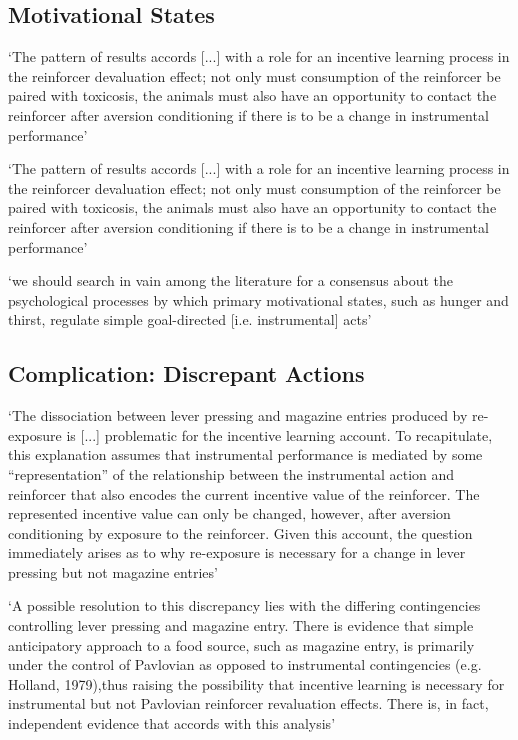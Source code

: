 \documentclass[12pt]{extarticle}
\begin{document}
\begin{multicols*}{3}
 
 
\section{Motivational States}
 
‘The pattern of results accords [...] with a role for an incentive learning
process in the reinforcer devaluation effect;
not only must consumption of
the reinforcer be paired with toxicosis,
the animals must also have an
opportunity to contact the reinforcer after aversion conditioning if there is
to be a change in instrumental performance’
\citep[p.~293]{balleine:1991_instrumental}

 
‘The pattern of results accords [...] with a role for an incentive learning
process in the reinforcer devaluation effect;
not only must consumption of
the reinforcer be paired with toxicosis,
the animals must also have an
opportunity to contact the reinforcer after aversion conditioning if there is
to be a change in instrumental performance’
\citep[p.~293]{balleine:1991_instrumental}
 
‘we should search in vain among the literature for a consensus about the
psychological processes by which primary motivational states, 
such as hunger and thirst, regulate simple goal-directed [i.e. instrumental] acts’
\citep[p.~1]{dickinson:1994_motivational}
 
\subsection{Complication: Discrepant Actions}
‘The dissociation between lever pressing and magazine entries produced by
re-exposure is [...] problematic for the incentive learning account.
To
recapitulate, this explanation assumes that instrumental performance is
mediated by some “representation” of the relationship between the instrumental 
action and reinforcer that also encodes the current incentive value of
the reinforcer. The represented incentive value can only be changed, however,
after aversion conditioning by exposure to the reinforcer.
Given this account,
the question immediately arises as to why re-exposure is necessary for a change
in lever pressing but not magazine entries’
\citep[p.~293]{balleine:1991_instrumental}
 
‘A possible resolution to this discrepancy lies with the differing contingencies controlling lever pressing and magazine entry. There is evidence that simple anticipatory approach to a food source, such as magazine entry, is primarily under the control of Pavlovian as opposed to instrumental contingencies (e.g. Holland, 1979),thus raising the possibility that incentive learning is necessary for instrumental but not Pavlovian reinforcer revaluation effects. There is, in fact, independent evidence that accords with this analysis’ \citep[p.~294]{balleine:1991_instrumental}
 


\end{multicols*}
\end{document}
